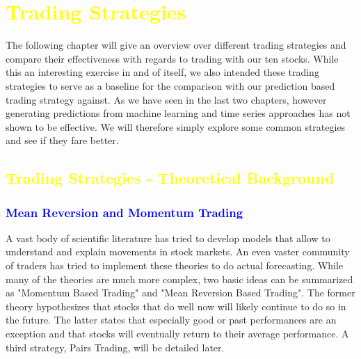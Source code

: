 \chapter{\textcolor{yellow}{Trading Strategies}}\label{ch:strategies}
The following chapter will give an overview over different trading strategies and compare their effectiveness with regards to trading with our ten stocks. While this an interesting exercise in and of itself, we also intended these trading strategies to serve as a baseline for the comparison with our prediction based trading strategy against. As we have seen in the last two chapters, however generating predictions from machine learning and time series approaches has not shown to be effective. We will therefore simply explore some common strategies and see if they fare better. 


\section{\textcolor{yellow}{Trading Strategies - Theoretical Background}}

\subsection{\textcolor{blue}{Mean Reversion and Momentum Trading}}
A vast body of scientific literature has tried to develop models that allow to understand and explain movements in stock markets. An even vaster community of traders has tried to implement these theories to do actual forecasting. While many of the theories are much more complex, two basic ideas can be summarized as "Momentum Based Trading" and "Mean Reversion Based Trading". The former theory hypothesizes that stocks that do well now will likely continue to do so in the future. The latter states that especially good or past performances are an exception and that stocks will eventually return to their average performance. A third strategy, Pairs Trading, will be detailed later. 

